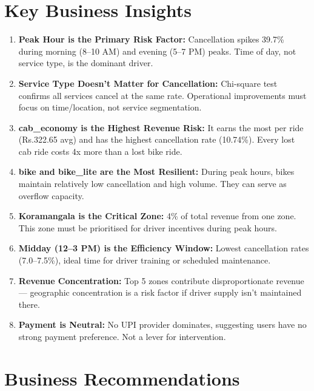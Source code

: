 \documentclass[12pt,a4paper]{article}
\begin{document}
\section{Key Business Insights}

\begin{enumerate}
  \item \textbf{Peak Hour is the Primary Risk Factor:} Cancellation spikes 39.7\% during morning (8--10 AM) and evening (5--7 PM) peaks. Time of day, not service type, is the dominant driver.
  \item \textbf{Service Type Doesn't Matter for Cancellation:} Chi-square test confirms all services cancel at the same rate. Operational improvements must focus on time/location, not service segmentation.
  \item \textbf{cab\_economy is the Highest Revenue Risk:} It earns the most per ride (Rs.322.65 avg) and has the highest cancellation rate (10.74\%). Every lost cab ride costs 4x more than a lost bike ride.
  \item \textbf{bike and bike\_lite are the Most Resilient:} During peak hours, bikes maintain relatively low cancellation and high volume. They can serve as overflow capacity.
  \item \textbf{Koramangala is the Critical Zone:} 4\% of total revenue from one zone. This zone must be prioritised for driver incentives during peak hours.
  \item \textbf{Midday (12--3 PM) is the Efficiency Window:} Lowest cancellation rates (7.0--7.5\%), ideal time for driver training or scheduled maintenance.
  \item \textbf{Revenue Concentration:} Top 5 zones contribute disproportionate revenue --- geographic concentration is a risk factor if driver supply isn't maintained there.
  \item \textbf{Payment is Neutral:} No UPI provider dominates, suggesting users have no strong payment preference. Not a lever for intervention.
\end{enumerate}

\section{Business Recommendations}
\end{document}
